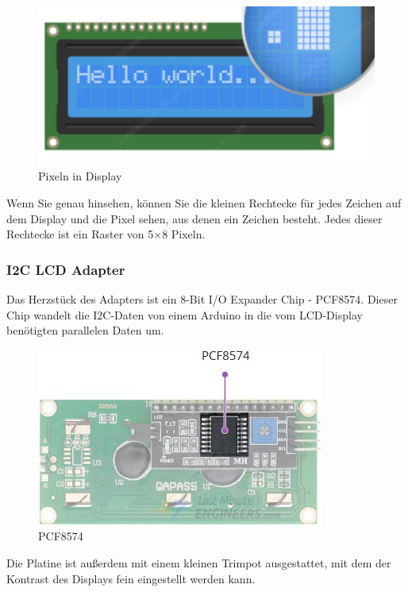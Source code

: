 \documentclass[conference]{IEEEtran}
\begin{document}
\begin{figure}[h]
	\begin{center}
		\includegraphics[scale=0.25]{dspl}
	\end{center}
	\caption{Pixeln in Display}
\end{figure}

Wenn Sie genau hinsehen, können Sie die kleinen Rechtecke für jedes Zeichen auf dem Display und die Pixel sehen, aus denen ein Zeichen besteht. Jedes dieser Rechtecke ist ein Raster von 5×8 Pixeln.

\subsubsection{I2C LCD Adapter}
Das Herzstück des Adapters ist ein 8-Bit I/O Expander Chip - PCF8574. Dieser Chip wandelt die I2C-Daten von einem Arduino in die vom LCD-Display benötigten parallelen Daten um.

\begin{figure}[h]
	\begin{center}
		\includegraphics[scale=0.35]{dspl1}
	\end{center}
	\caption{PCF8574}
\end{figure}

Die Platine ist außerdem mit einem kleinen Trimpot ausgestattet, mit dem der Kontrast des Displays fein eingestellt werden kann.
\end{document}
